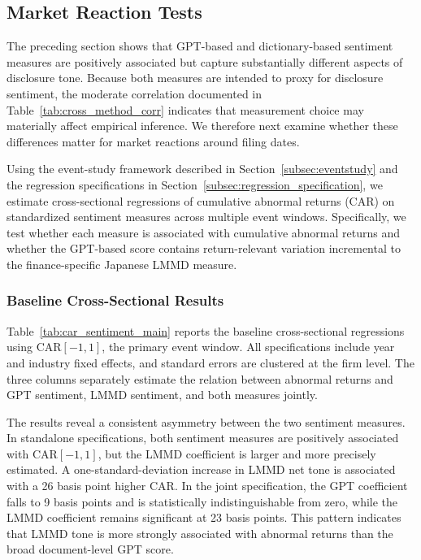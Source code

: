 \subsection{Market Reaction Tests}
\label{subsec:market_reaction_tests}

The preceding section shows that GPT-based and dictionary-based sentiment measures are positively associated but capture substantially different aspects of disclosure tone. Because both measures are intended to proxy for disclosure sentiment, the moderate correlation documented in Table~\ref{tab:cross_method_corr} indicates that measurement choice may materially affect empirical inference. We therefore next examine whether these differences matter for market reactions around filing dates.

Using the event-study framework described in Section~\ref{subsec:eventstudy} and the regression specifications in Section~\ref{subsec:regression_specification}, we estimate cross-sectional regressions of cumulative abnormal returns (CAR) on standardized sentiment measures across multiple event windows. Specifically, we test whether each measure is associated with cumulative abnormal returns and whether the GPT-based score contains return-relevant variation incremental to the finance-specific Japanese LMMD measure.

\subsubsection{Baseline Cross-Sectional Results}

Table~\ref{tab:car_sentiment_main} reports the baseline cross-sectional regressions using $\mathrm{CAR}[-1,1]$, the primary event window. All specifications include year and industry fixed effects, and standard errors are clustered at the firm level. The three columns separately estimate the relation between abnormal returns and GPT sentiment, LMMD sentiment, and both measures jointly.



The results reveal a consistent asymmetry between the two sentiment measures. In standalone specifications, both sentiment measures are positively associated with $\mathrm{CAR}[-1,1]$, but the LMMD coefficient is larger and more precisely estimated. A one-standard-deviation increase in LMMD net tone is associated with a 26 basis point higher CAR. In the joint specification, the GPT coefficient falls to 9 basis points and is statistically indistinguishable from zero, while the LMMD coefficient remains significant at 23 basis points. This pattern indicates that LMMD tone is more strongly associated with abnormal returns than the broad document-level GPT score.

